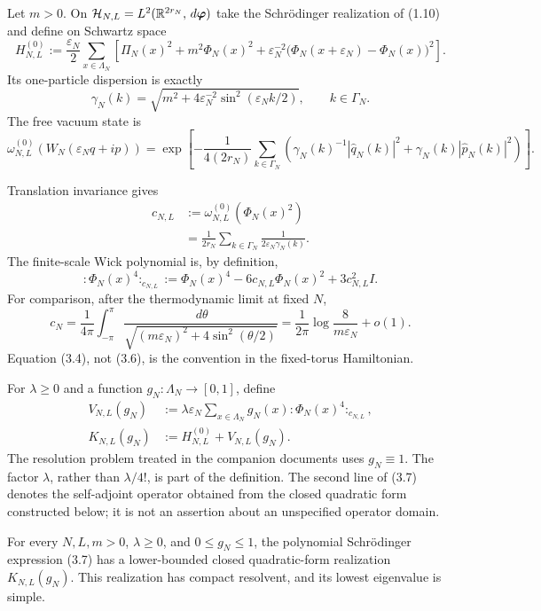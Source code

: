 \documentclass[11pt,a4paper]{article}
\newcommand{\eps}{\varepsilon}
\newcommand{\dd}{\,d}
\begin{document}
Let \(m>0\).  On
\(
 \Hh_{N,L}=L^2(\R^{2r_N},\dd\bm\varphi)
\)
take the Schrödinger realization of (1.10) and define on Schwartz space
\[
 H_{N,L}^{(0)}
 :=\frac{\eps_N}{2}\sum_{x\in\Lambda_N}
 \left[\Pi_N(x)^2+m^2\Phi_N(x)^2
 +\eps_N^{-2}\bigl(\Phi_N(x+\eps_N)-\Phi_N(x)\bigr)^2\right]. \tag{3.1}
\]
Its one-particle dispersion is exactly
\[
 \gamma_N(k)
 =\sqrt{m^2+4\eps_N^{-2}\sin^2(\eps_Nk/2)},\qquad k\in\Gamma_N.\tag{3.2}
\]
The free vacuum state is
\[
 \omega_{N,L}^{(0)}(W_N(\eps_Nq+ip))
 =\exp\!\left[-\frac1{4(2r_N)}\sum_{k\in\Gamma_N}
 \left(\gamma_N(k)^{-1}|\widehat q_N(k)|^2
       +\gamma_N(k)|\widehat p_N(k)|^2\right)\right].          \tag{3.3}
\]


Translation invariance gives
\begin{align}
 c_{N,L}
 &:=\omega_{N,L}^{(0)}(\Phi_N(x)^2)\\
 &=\frac1{2r_N}\sum_{k\in\Gamma_N}\frac1{2\eps_N\gamma_N(k)}.
                                                                    \tag{3.4}
\end{align}
The finite-scale Wick polynomial is, by definition,
\[
 {:}\Phi_N(x)^4{:}_{c_{N,L}}
 :=\Phi_N(x)^4-6c_{N,L}\Phi_N(x)^2+3c_{N,L}^2I.                \tag{3.5}
\]
For comparison, after the thermodynamic limit at fixed \(N\),
\[
 c_N=\frac1{4\pi}\int_{-\pi}^{\pi}
 \frac{\dd\theta}{\sqrt{(m\eps_N)^2+4\sin^2(\theta/2)}}
 =\frac1{2\pi}\log\frac8{m\eps_N}+o(1).                      \tag{3.6}
\]
Equation (3.4), not (3.6), is the convention in the fixed-torus Hamiltonian.


For \(\lambda\ge0\) and a function \(g_N:\Lambda_N\to[0,1]\), define
\begin{align}
 V_{N,L}(g_N)
 &:=\lambda\eps_N\sum_{x\in\Lambda_N}
       g_N(x){:}\Phi_N(x)^4{:}_{c_{N,L}},\\
 K_{N,L}(g_N)&:=H_{N,L}^{(0)}+V_{N,L}(g_N).                    \tag{3.7}
\end{align}
The resolution problem treated in the companion documents uses \(g_N\equiv1\).
The factor \(\lambda\), rather than \(\lambda/4!\), is part of the definition.
The second line of (3.7) denotes the self-adjoint operator obtained from the
closed quadratic form constructed below; it is not an assertion about an
unspecified operator domain.

\begin{proposition}
For every \(N,L,m>0\), \(\lambda\ge0\), and \(0\le g_N\le1\), the polynomial
Schrödinger expression (3.7) has a lower-bounded closed quadratic-form
realization \(K_{N,L}(g_N)\).  This realization has compact resolvent, and its
lowest eigenvalue is simple.
\end{proposition}
\end{document}
